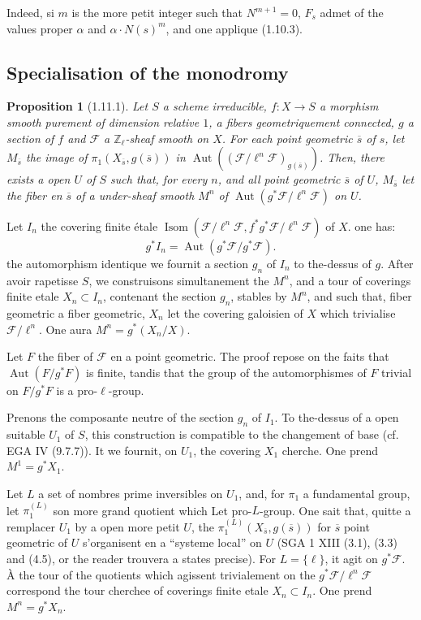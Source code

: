 \documentclass[12pt,a4paper]{article}
\theoremstyle{plain}
\newtheorem{proposition}[theorem]{Proposition}
\theoremstyle{definition}
\theoremstyle{remark}
\DeclareMathOperator{\Aut}{Aut}
\DeclareMathOperator{\Isom}{Isom}
\newcommand{\ZZ}{{\mathbb{Z}}}
\begin{document}
Indeed, si $m$ is the more petit integer such that $N^{m+1} = 0$, $F_s$ admet of the values proper $\alpha$ and $\alpha \cdot N(s)^m$, and one applique (1.10.3).


\subsection{Specialisation of the monodromy}

\begin{proposition}[1.11.1]
Let $S$ a scheme irreducible, $f : X \to S$ a morphism smooth purement of dimension relative $1$, a fibers geometriquement connected, $g$ a section of $f$ and $\mathscr{F}$ a $\ZZ_\ell$-sheaf smooth on $X$. For each point geometric $\overline{s}$ of $s$, let $M_{\overline{s}}$ the image of $\pi_1(X_{\overline{s}}, g(\overline{s}))$ in $\Aut((\mathscr{F}/\ell^n \mathscr{F})_{g(\overline{s})})$. Then, there exists a open $U$ of $S$ such that, for every $n$, and all point geometric $\overline{s}$ of $U$, $M_{\overline{s}}$ let the fiber en $\overline{s}$ of a under-sheaf smooth $M^n$ of $\Aut(g^*\mathscr{F}/\ell^n \mathscr{F})$ on $U$.
\end{proposition}

Let $I_n$ the covering finite étale $\Isom(\mathscr{F}/\ell^n \mathscr{F}, f^*g^*\mathscr{F}/\ell^n \mathscr{F})$ of $X$. one has:
\[ g^* I_n = \Aut(g^*\mathscr{F}/g^*\mathscr{F}). \]
the automorphism identique we fournit a section $g_n$ of $I_n$ to the-dessus of $g$. After avoir rapetisse $S$, we construisons simultanement the $M^n$, and a tour of coverings finite etale $X_n \subset I_n$, contenant the section $g_n$, stables by $M^n$, and such that, fiber geometric a fiber geometric, $X_n$ let the covering galoisien of $X$ which trivialise $\mathscr{F}/\ell^n$. One aura $M^n = g^*(X_n/X)$.

Let $F$ the fiber of $\mathscr{F}$ en a point geometric. The proof repose on the faits that $\Aut(F/g^*F)$ is finite, tandis that the group of the automorphismes of $F$ trivial on $F/g^*F$ is a pro-$\ell$-group.

Prenons the composante neutre of the section $g_n$ of $I_1$. To the-dessus of a open suitable $U_1$ of $S$, this construction is compatible to the changement of base (cf. EGA IV (9.7.7)). It we fournit, on $U_1$, the covering $X_1$ cherche. One prend $M^1 = g^* X_1$.

Let $L$ a set of nombres prime inversibles on $U_1$, and, for $\pi_1$ a fundamental group, let $\pi_1^{(L)}$ son more grand quotient which Let pro-$L$-group. One sait that, quitte a remplacer $U_1$ by a open more petit $U$, the $\pi_1^{(L)}(X_{\overline{s}}, g(\overline{s}))$ for $\overline{s}$ point geometric of $U$ s'organisent en a ``systeme local'' on $U$ (SGA 1 XIII (3.1), (3.3) and (4.5), or the reader trouvera a states precise). For $L = \{\ell\}$, it agit on $g^*\mathscr{F}$. \`A the tour of the quotients which agissent trivialement on the $g^*\mathscr{F}/\ell^n \mathscr{F}$ correspond the tour cherchee of coverings finite etale $X_n \subset I_n$. One prend $M^n = g^* X_n$.
\end{document}
